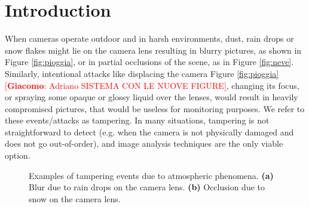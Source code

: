 \documentclass{llncs}
\newcommand{\gi}[1]{{\textcolor{red}{[\small \textbf{Giacomo}: #1]}}}
\begin{document}
\section{Introduction}\label{sec:introduction}
When cameras operate outdoor and in harsh environments, dust, rain drops or snow flakes might lie on the camera lens resulting in blurry pictures, as shown in Figure \ref{fig:pioggia}, or in partial occlusions of the scene, as in Figure \ref{fig:neve}. Similarly, intentional attacks like displacing the camera Figure \ref{fig:pioggia} \gi{Adriano SISTEMA CON LE NUOVE FIGURE}, changing its focus, or spraying some opaque or glossy liquid over the lenses, would result in heavily compromised pictures, that would be useless for monitoring purposes. We refer to these events/attacks as tampering. In many situations, tampering is not straightforward to detect (e.g. when the camera is not physically damaged and does not go out-of-order), and image analysis techniques are the only viable option.

\begin{figure}[t!]
\centering
{}
\caption[Tampering examples]{Examples of tampering events due to atmospheric phenomena. \textbf{(a)} Blur due to rain drops on the camera lens. \textbf{(b)} Occlusion due to snow on the camera lens.}
\label{fig:tampering}
\end{figure}
\end{document}

